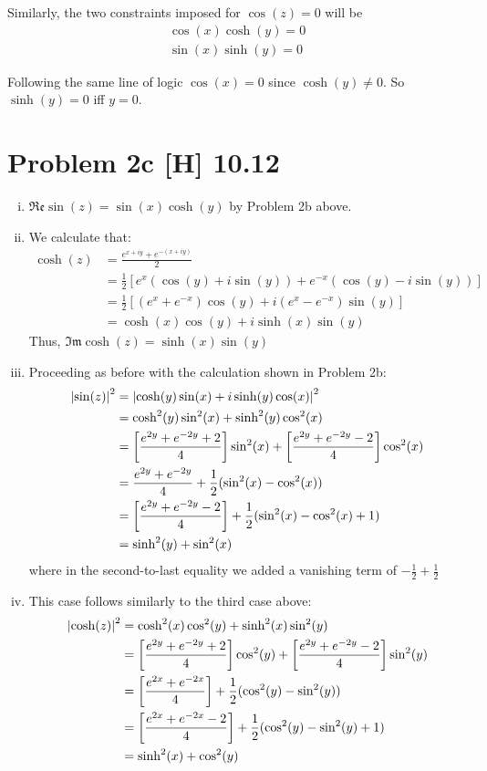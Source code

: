 \documentclass[12pt]{article}%
\begin{document}
Similarly, the two constraints imposed for $\cos(z) = 0$ will be
\begin{align*}
  \cos(x)\cosh(y) =0 \\
   \sin(x)\sinh(y) = 0
\end{align*}

Following the same line of logic $\cos(x) = 0$ since $\cosh(y) \neq 0$. So $\sinh(y) = 0$ iff $y =0$.

\section*{Problem 2c [H] 10.12}

\begin{enumerate}[i.]
  \item $\mathfrak{Re}\sin(z) = \sin(x)\cosh(y)$ by Problem 2b above.
  \item
  We calculate that:
  \begin{align*}
    \cosh(z) & = \frac{e^{x+iy} + e^{-(x+iy)}}{2} \\
    & = \frac{1}{2}\left[e^x(\cos(y) + i\sin(y)) + e^{-x}(\cos(y) - i\sin(y))\right] \\
    & = \frac{1}{2}\left[(e^x + e^{-x})\cos(y) + i(e^x - e^{-x})\sin(y)\right] \\
    & = \cosh(x)\cos(y) + i\sinh(x)\sin(y)
  \end{align*}
  Thus, $\mathfrak{Im}\cosh(z) = \sinh(x)\sin(y)$

  \item
  Proceeding as before with the calculation shown in Problem 2b:
  \begin{align*}
    \abs{\sin(z)}^2 & = \abs{\cosh(y)\sin(x)+ i \sinh(y)\cos(x)}^2 \\
    & = \cosh^2(y)\sin^2(x) + \sinh^2(y)\cos^2(x) \\
    & = \left[\frac{e^{2y} + e^{-2y} + 2}{4}\right]\sin^2(x) + \left[\frac{e^{2y} + e^{-2y} - 2}{4}\right]\cos^2(x) \\
    & =  \frac{e^{2y} + e^{-2y}}{4} + \frac{1}{2} (\sin^2(x) - \cos^2(x)) \\
    & = \left[ \frac{e^{2y} + e^{-2y} - 2}{4}\right] + \frac{1}{2}(\sin^2(x) - \cos^2(x) + 1) \\
    & = \sinh^2(y) + \sin^2(x)
  \end{align*}
  where in the second-to-last equality we added a vanishing term of $- \frac{1}{2} + \frac{1}{2}$

  \item
  This case follows similarly to the third case above:
  \begin{align*}
    \abs{\cosh(z)}^2 & = \cosh^2(x)\cos^2(y) + \sinh^2(x)\sin^2(y) \\
    & = \left[\frac{e^{2y} + e^{-2y} + 2}{4}\right]\cos^2(y) + \left[\frac{e^{2y} + e^{-2y} - 2}{4}\right]\sin^2(y) \\
    & = \left[\frac{e^{2x} + e^{-2x}}{4}\right] + \frac{1}{2}(\cos^2(y) - \sin^2(y)) \\
    & = \left[\frac{e^{2x} + e^{-2x} - 2}{4}\right] + \frac{1}{2}(\cos^2(y) - \sin^2(y) + 1) \\
    & =\sinh^2(x) + \cos^2(y)
  \end{align*}
\end{enumerate}
\end{document}
